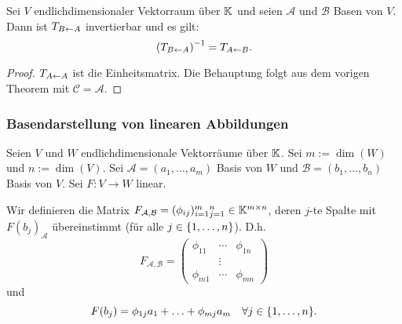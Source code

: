 \begin{klr}
	Sei $ V $ endlichdimensionaler Vektorraum über $ \mathbb K $ und seien $ \mathcal{A} $ und $ \mathcal{B} $ Basen von $ V $. Dann ist $ T_{B \leftarrow A} $ invertierbar und es gilt:
	\begin{equation}
		\left( T_{B \leftarrow A} \right)^{-1} = T_{A \leftarrow B}.
	\end{equation}
\end{klr}
\begin{proof}
	$ T_{A \leftarrow A} $ ist die Einheitsmatrix. Die Behauptung folgt aus dem vorigen Theorem mit $ \mathcal{C} = \mathcal{A} $.
\end{proof}

\subsubsection{Basendarstellung von linearen Abbildungen}

Seien $ V $ und $ W $ endlichdimensionale Vektorräume über $ \mathbb K $. Sei $ m := \dim(W) $ und $ n := \dim(V) $. Sei $ \mathcal{A} = (a_1, \ldots, a_m) $ Basis von $ W $ und $ \mathcal{B} = (b_1, \ldots, b_n) $ Basis von $ V $. Sei $ F : V \to W $ linear.

Wir definieren die Matrix $ F_\mathcal{A,B} = (\phi_{ij}){}_{i=1}^m{}_{j=1}^n \in \mathbb K^{m \times n} $, deren $ j $-te Spalte mit $ F(b_j)_\mathcal{A} $ übereinstimmt (für alle $ j \in \{ 1,\ldots,n \} $). D.h.
\begin{equation}
	F_\mathcal{A,B} =
	\begin{pmatrix}
		\phi_{11} & \cdots & \phi_{1n} \\
		 &  \vdots &  \\
		\phi_{m1} & \cdots & \phi_{mn}
	\end{pmatrix}
\end{equation}
und
\begin{equation}
	F(b_j) = \phi_{1j}a_1 + \ldots + \phi_{mj}a_m \quad \forall j \in \{ 1,\ldots,n \}.
\end{equation}


